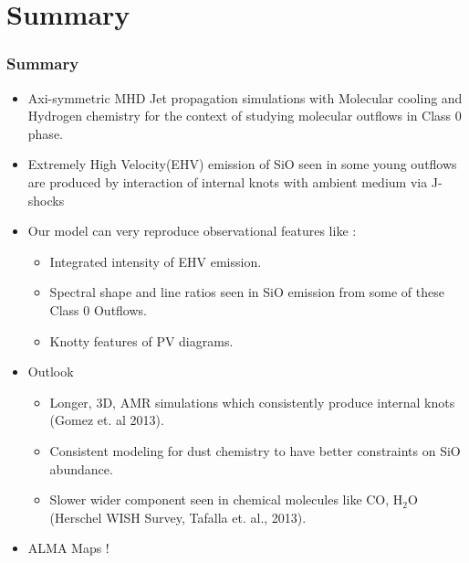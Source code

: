 \documentclass[8pt,xcolor=dvipsnames]{beamer}
\begin{document}
\section{Summary}
\begin{frame}
\frametitle{Summary}
\begin{itemize}
\item Axi-symmetric MHD Jet propagation simulations with
  \alert{Molecular cooling and Hydrogen chemistry} for the context of studying molecular outflows in Class 0 phase.

\item Extremely High Velocity(EHV) emission of SiO seen in some young
  outflows are produced by \alert{interaction of internal knots with ambient
  medium via J-shocks}

\item Our model can very \alert{reproduce observational features} like :
  \begin{itemize}
    \item Integrated intensity of EHV emission.
    \item Spectral shape and line ratios seen in SiO emission from some of these Class 0 Outflows.
    \item Knotty features of PV diagrams. 
  \end{itemize}

\item \alert{Outlook}
\begin{itemize}
  \item Longer, 3D, AMR simulations which consistently produce
    internal knots (\alert{Gomez et. al 2013}).
  \item Consistent modeling for dust chemistry to have better
    constraints on SiO abundance.
  \item Slower wider component seen in chemical molecules like CO, H$_{2}$O (Herschel WISH
    Survey, \alert{Tafalla et. al., 2013}).
\end{itemize}

\item \alert{ALMA Maps !}
\end{itemize}
\end{frame}
\end{document}
